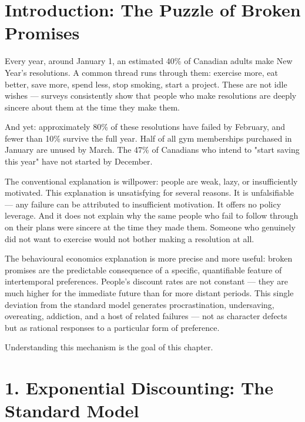 \documentclass[12pt, letterpaper]{article}
\begin{document}
\medskip


\section*{Introduction: The Puzzle of Broken Promises}


Every year, around January 1, an estimated 40\% of Canadian adults make New Year's resolutions. A common thread runs through them: exercise more, eat better, save more, spend less, stop smoking, start a project. These are not idle wishes --- surveys consistently show that people who make resolutions are deeply sincere about them at the time they make them.

And yet: approximately 80\% of these resolutions have failed by February, and fewer than 10\% survive the full year. Half of all gym memberships purchased in January are unused by March. The 47\% of Canadians who intend to "start saving this year" have not started by December.

The conventional explanation is willpower: people are weak, lazy, or insufficiently motivated. This explanation is unsatisfying for several reasons. It is unfalsifiable --- any failure can be attributed to insufficient motivation. It offers no policy leverage. And it does not explain why the same people who fail to follow through on their plans were sincere at the time they made them. Someone who genuinely did not want to exercise would not bother making a resolution at all.

The behavioural economics explanation is more precise and more useful: broken promises are the predictable consequence of a specific, quantifiable feature of intertemporal preferences. People's discount rates are not constant --- they are much higher for the immediate future than for more distant periods. This single deviation from the standard model generates procrastination, undersaving, overeating, addiction, and a host of related failures --- not as character defects but as rational responses to a particular form of preference.

Understanding this mechanism is the goal of this chapter.

\medskip


\section{1. Exponential Discounting: The Standard Model}
\end{document}
